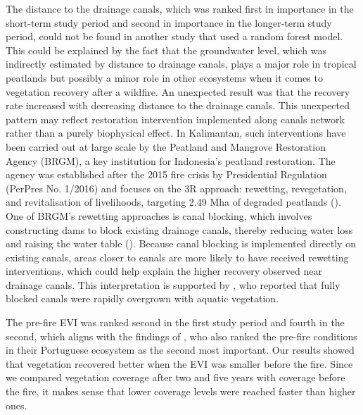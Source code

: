 \documentclass[
  fontsize=12pt,
  paper=a4,
  parskip=half,
  headings=big,
  DIV=12
]{scrreprt}
\begin{document}
The distance to the drainage canals, which was ranked first in importance in the short-term study period and second in importance in the longer-term study period, could not be found in another study that used a random forest model. This could be explained by the fact that the groundwater level, which was indirectly estimated by distance to drainage canals, plays a major role in tropical peatlands but possibly a minor role in other ecosystems when it comes to vegetation recovery after a wildfire. An unexpected result was that the recovery rate increased with decreasing distance to the drainage canals. This unexpected pattern may reflect restoration intervention implemented along canals network rather than a purely biophysical effect.
In Kalimantan, such interventions have been carried out at large scale by the Peatland and Mangrove Restoration Agency (BRGM), a key institution for Indonesia's peatland restoration. The agency was established after the 2015 fire crisis by Presidential Regulation (PerPres No. 1/2016) and focuses on the 3R approach: rewetting, revegetation, and revitalisation of livelihoods, targeting 2.49 Mha of degraded peatlands (\cite{giesen_roles_2023}). One of BRGM’s rewetting approaches is canal blocking, which involves constructing dams to block existing drainage canals, thereby reducing water loss and raising the water table (\cite{fleming_community_2024}). Because canal blocking is implemented directly on existing canals, areas closer to canals are more likely to have received rewetting interventions, which could help explain the higher recovery observed near drainage canals. This interpretation is supported by \cite{hooijer_benefits_2024}, who reported that fully blocked canals were rapidly overgrown with aquatic vegetation.

The pre-fire EVI was ranked second in the first study period and fourth in the second, which aligns with the findings of \textcite{joao_indicator-based_2018}, who also ranked the pre-fire conditions in their Portuguese ecosystem as the second most important. Our results showed that vegetation recovered better when the EVI was smaller before the fire. Since we compared vegetation coverage after two and five years with coverage before the fire, it makes sense that lower coverage levels were reached faster than higher ones.
\end{document}
